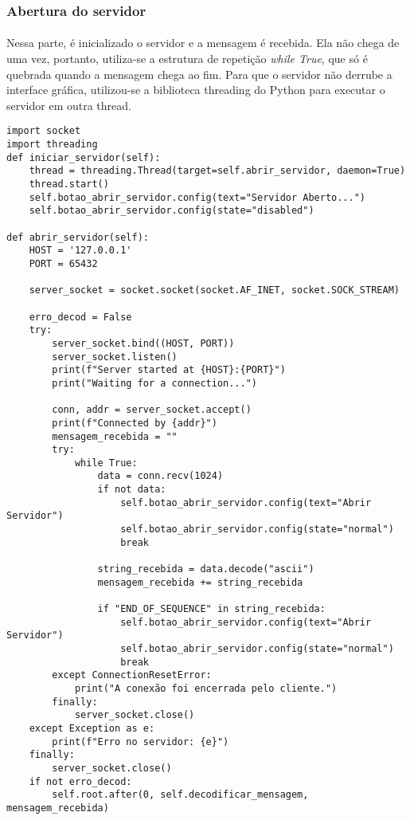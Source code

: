 \documentclass[12pt, a4paper]{article}
\newenvironment{code}{\captionsetup{type=listing}}{}
\begin{document}
\subsubsection{Abertura do servidor}
\paragraph{}
Nessa parte, é inicializado o servidor e a mensagem é recebida. Ela não chega de uma vez, portanto, utiliza-se a estrutura de repetição \textit{while True}, que só é quebrada quando a mensagem chega ao fim. Para que o servidor não derrube a interface gráfica, utilizou-se a biblioteca threading do Python para executar o servidor em outra thread.

\begin{code}
\begin{verbatim}
import socket
import threading
def iniciar_servidor(self):
    thread = threading.Thread(target=self.abrir_servidor, daemon=True)
    thread.start()
    self.botao_abrir_servidor.config(text="Servidor Aberto...")
    self.botao_abrir_servidor.config(state="disabled")

def abrir_servidor(self):
    HOST = '127.0.0.1'
    PORT = 65432

    server_socket = socket.socket(socket.AF_INET, socket.SOCK_STREAM)
    
    erro_decod = False
    try:
        server_socket.bind((HOST, PORT))
        server_socket.listen()
        print(f"Server started at {HOST}:{PORT}")
        print("Waiting for a connection...")
        
        conn, addr = server_socket.accept()
        print(f"Connected by {addr}")
        mensagem_recebida = ""
        try:
            while True:
                data = conn.recv(1024)
                if not data:
                    self.botao_abrir_servidor.config(text="Abrir Servidor")
                    self.botao_abrir_servidor.config(state="normal")
                    break
                
                string_recebida = data.decode("ascii")
                mensagem_recebida += string_recebida
                
                if "END_OF_SEQUENCE" in string_recebida:
                    self.botao_abrir_servidor.config(text="Abrir Servidor")
                    self.botao_abrir_servidor.config(state="normal")
                    break
        except ConnectionResetError:
            print("A conexão foi encerrada pelo cliente.")
        finally:
            server_socket.close()
    except Exception as e:
        print(f"Erro no servidor: {e}")
    finally:
        server_socket.close()
    if not erro_decod:
        self.root.after(0, self.decodificar_mensagem, mensagem_recebida)
\end{verbatim}
\end{code}
\end{document}
